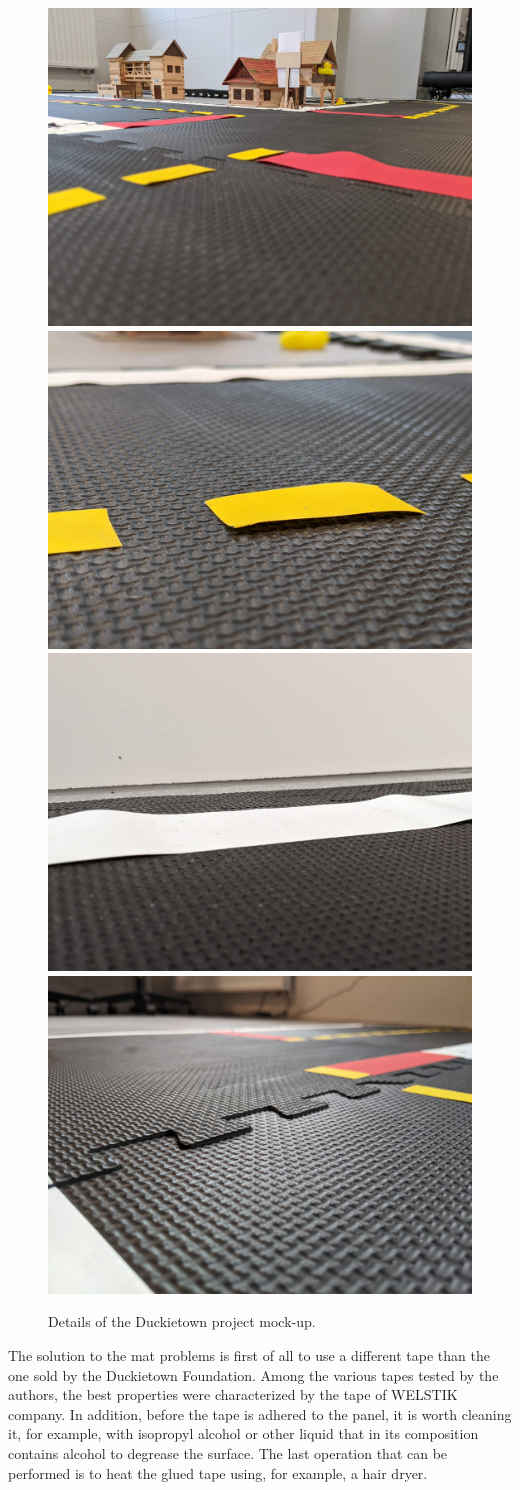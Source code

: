 \documentclass[conference]{IEEEtran}
\begin{document}
\begin{figure}[ht!]
    \centering
    \includegraphics[width=.475\columnwidth]{floor-1.jpg}
    \includegraphics[width=.475\columnwidth]{floor-2.jpg}
    \\
    \includegraphics[width=.475\columnwidth]{floor-3.jpg}
    \includegraphics[width=.475\columnwidth]{floor-4.jpg}
    \caption{Details of the Duckietown project mock-up.}
    \label{fig:smart-city-plan-1}
\end{figure}

The solution to the mat problems is first of all to use a different tape than the one sold by the Duckietown Foundation. Among the various tapes tested by the authors, the best properties were characterized by the tape of WELSTIK company. In addition, before the tape is adhered to the panel, it is worth cleaning it, for example, with isopropyl alcohol or other liquid that in its composition contains alcohol to degrease the surface. The last operation that can be performed is to heat the glued tape using, for example, a hair dryer. 
\end{document}
